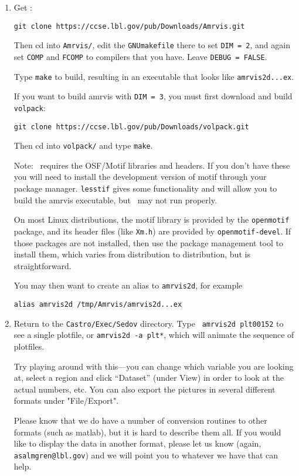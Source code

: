 \begin{enumerate}

\item Get \amrvis:
\begin{verbatim}
git clone https://ccse.lbl.gov/pub/Downloads/Amrvis.git
\end{verbatim}

Then cd into {\tt Amrvis/}, edit the {\tt GNUmakefile} there
to set {\tt DIM = 2}, and again set {\tt COMP} and {\tt FCOMP} to compilers that
you have. Leave {\tt DEBUG = FALSE}.

Type {\tt make} to build, resulting in an executable that
looks like {\tt amrvis2d...ex}.

If you want to build amrvis with {\tt DIM = 3}, you must first
download and build {\tt volpack}:
\begin{verbatim}
git clone https://ccse.lbl.gov/pub/Downloads/volpack.git
\end{verbatim}

Then cd into {\tt volpack/} and type {\tt make}.

Note: \amrvis\ requires the OSF/Motif libraries and headers. If you don't have these 
you will need to install the development version of motif through your package manager. 
{\tt lesstif} gives some functionality and will allow you to build the amrvis executable, 
but \amrvis\ may not run properly.

On most Linux distributions, the motif library is provided by the
{\tt openmotif} package, and its header files (like {\tt Xm.h}) are provided
by {\tt openmotif-devel}. If those packages are not installed, then use the
package management tool to install them, which varies from
distribution to distribution, but is straightforward. 

You may then want to create an alias to {\tt amrvis2d}, for example
\begin{verbatim}
alias amrvis2d /tmp/Amrvis/amrvis2d...ex
\end{verbatim}

\item Return to the {\tt Castro/Exec/Sedov} directory.  Type {\tt
  amrvis2d plt00152} to see a single plotfile, or {\tt amrvis2d -a
  plt*}, which will animate the sequence of plotfiles.

  Try playing
  around with this---you can change which variable you are
  looking at, select a region and click ``Dataset'' (under View)
  in order to look at the actual numbers, etc. You can also export the
  pictures in several different formats under "File/Export".

Please know that we do have a number of conversion routines to other
formats (such as matlab), but it is hard to describe them all. If you
would like to display the data in another format, please let us know
(again, {\tt asalmgren@lbl.gov}) and we will point you to whatever we have
that can help.

\end{enumerate}

